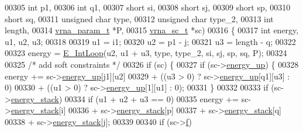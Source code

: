 \begin{DoxyCode}
00305                       \textcolor{keywordtype}{int}           p1,
00306                       \textcolor{keywordtype}{int}           q1,
00307                       \textcolor{keywordtype}{short}         si,
00308                       \textcolor{keywordtype}{short}         sj,
00309                       \textcolor{keywordtype}{short}         sp,
00310                       \textcolor{keywordtype}{short}         sq,
00311                       \textcolor{keywordtype}{unsigned} \textcolor{keywordtype}{char} type,
00312                       \textcolor{keywordtype}{unsigned} \textcolor{keywordtype}{char} type\_2,
00313                       \textcolor{keywordtype}{int}           length,
00314                       \mbox{\hyperlink{group__energy__parameters_structvrna__param__s}{vrna\_param\_t}}  *P,
00315                       \mbox{\hyperlink{group__soft__constraints_structvrna__sc__s}{vrna\_sc\_t}}     *sc)
00316 \{
00317   \textcolor{keywordtype}{int} energy, u1, u2, u3;
00318 
00319   u1  = i1;
00320   u2  = p1 - j;
00321   u3  = length - q;
00322 
00323   energy = \mbox{\hyperlink{group__loops_gaafbc187b7f78e8e82afb77dd6f3b8fc5}{E\_IntLoop}}(u2, u1 + u3, type, type\_2, si, sj, sp, sq, P);
00324 
00325   \textcolor{comment}{/* add soft constraints */}
00326   \textcolor{keywordflow}{if} (sc) \{
00327     \textcolor{keywordflow}{if} (sc->\mbox{\hyperlink{group__soft__constraints_a57e4dbb924ab11f304e3762a3a9b07a1}{energy\_up}}) \{
00328       energy += sc->\mbox{\hyperlink{group__soft__constraints_a57e4dbb924ab11f304e3762a3a9b07a1}{energy\_up}}[j1][u2]
00329                 + ((u3 > 0) ? sc->\mbox{\hyperlink{group__soft__constraints_a57e4dbb924ab11f304e3762a3a9b07a1}{energy\_up}}[q1][u3] : 0)
00330                 + ((u1 > 0) ? sc->\mbox{\hyperlink{group__soft__constraints_a57e4dbb924ab11f304e3762a3a9b07a1}{energy\_up}}[1][u1] : 0);
00331     \}
00332 
00333     \textcolor{keywordflow}{if} (sc->\mbox{\hyperlink{group__soft__constraints_ac20dded6068e81acd0f1139092f66a22}{energy\_stack}})
00334       \textcolor{keywordflow}{if} (u1 + u2 + u3 == 0)
00335         energy += sc->\mbox{\hyperlink{group__soft__constraints_ac20dded6068e81acd0f1139092f66a22}{energy\_stack}}[i]
00336                   + sc->\mbox{\hyperlink{group__soft__constraints_ac20dded6068e81acd0f1139092f66a22}{energy\_stack}}[p]
00337                   + sc->\mbox{\hyperlink{group__soft__constraints_ac20dded6068e81acd0f1139092f66a22}{energy\_stack}}[q]
00338                   + sc->\mbox{\hyperlink{group__soft__constraints_ac20dded6068e81acd0f1139092f66a22}{energy\_stack}}[j];
00339 
00340     \textcolor{keywordflow}{if} (sc->\mbox{\hyperlink{group__soft__constraints_a32dc86090237888c75491bbd4861a04b}{f}})

\end{DoxyCode}
